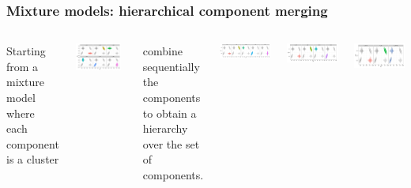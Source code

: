 \begin{frame}[t]
\frametitle{Mixture models: hierarchical component merging}
\begin{columns}[T]
\small
Starting from a mixture model where each component is a cluster

\medskip

\includegraphics[width=0.9\textwidth]{static_figures/baudry_ex4_1_all_distributions.pdf}

combine sequentially the components to obtain a hierarchy over the set of components.

\pause
{}
\centering
\includegraphics[height=0.2\textheight]{static_figures/baudry_ex4_1_all_distributions_5c.pdf}

\includegraphics[height=0.2\textheight]{static_figures/baudry_ex4_1_all_distributions_4c.pdf}

\includegraphics[height=0.2\textheight]{static_figures/baudry_ex4_1_all_distributions_3c.pdf} 


\end{columns}
\end{frame}
